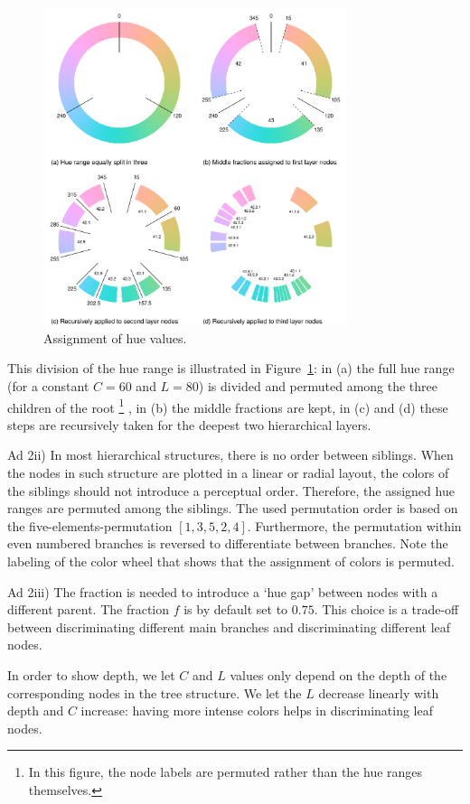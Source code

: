 \documentclass[review]{vgtc}                 %
\begin{document}
\begin{figure}[htb]
  \centering
  \includegraphics[width=3.5in]{hcl_method.pdf}
  \caption{Assignment of hue values.}\label{fig:wheel}
\end{figure}

This division of the hue range is illustrated in Figure~\ref{fig:wheel}: in (a) the full hue range (for a constant $C=60$ and $L=80$)  is divided and permuted among the three children of the root
\footnote{In this figure, the node labels are permuted rather than the hue ranges themselves.} , in (b) the middle fractions are kept, in (c) and (d) these steps are recursively taken for the deepest two hierarchical layers.

Ad 2ii) In most hierarchical structures, there is no order between siblings. When the nodes in such structure are plotted in a linear or radial layout, the colors of the siblings should not introduce a perceptual order. Therefore, the assigned hue ranges are permuted among the siblings. The used permutation order is based on the five-elements-permutation $[1, 3, 5, 2, 4]$. Furthermore, the permutation within even numbered branches is reversed to differentiate between branches. Note the labeling of the color wheel that shows that the assignment of colors is permuted.

Ad 2iii) The fraction is needed to introduce a `hue gap' between nodes with a different parent. The fraction $f$ is by default set to $0.75$. This choice is a trade-off between discriminating different main branches and discriminating different leaf nodes. 

In order to show depth, we let $C$ and $L$ values only depend on the depth of the corresponding nodes in the tree structure. We let the $L$ decrease linearly with depth and $C$ increase: having more intense colors helps in discriminating leaf nodes.
\end{document}

